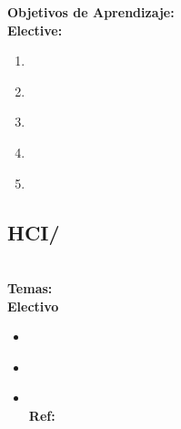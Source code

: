 \noindent \textbf{Objetivos de Aprendizaje:}\\
\noindent \textbf{Elective:}
\begin{enumerate}
	\setcounter{enumi}{0}
	\item \HCIUsercentereddesignandtestingLOExplainHowDesign\xspace[\HCIUsercentereddesignandtestingLOExplainHowDesignLevel]\label{sec:BOK:HCIUsercentereddesignandtestingLOExplainHowDesign}
	\item \HCIUsercentereddesignandtestingLOUseLo\xspace[\HCIUsercentereddesignandtestingLOUseLoLevel]\label{sec:BOK:HCIUsercentereddesignandtestingLOUseLo}
	\item \HCIUsercentereddesignandtestingLOChooseAppropriate\xspace[\HCIUsercentereddesignandtestingLOChooseAppropriateLevel]\label{sec:BOK:HCIUsercentereddesignandtestingLOChooseAppropriate}
	\item \HCIUsercentereddesignandtestingLOUseATechniques\xspace[\HCIUsercentereddesignandtestingLOUseATechniquesLevel]\label{sec:BOK:HCIUsercentereddesignandtestingLOUseATechniques}
	\item \HCIUsercentereddesignandtestingLOCompareThe\xspace[\HCIUsercentereddesignandtestingLOCompareTheLevel]\label{sec:BOK:HCIUsercentereddesignandtestingLOCompareThe}
\end{enumerate}


\subsection{HCI/\HCINewInteractiveTechnologies}\label{sec:BOK:HCINewInteractiveTechnologies}
\HCINewInteractiveTechnologiesDescription\\
\noindent \textbf{Temas:}\\
\noindent \textbf{Electivo}
\begin{itemize}
	\item \HCINewInteractiveTechnologiesTopicChoosing\label{sec:BOK:HCINewInteractiveTechnologiesTopicChoosing}
	\item \HCINewInteractiveTechnologiesTopicRepresenting\label{sec:BOK:HCINewInteractiveTechnologiesTopicRepresenting}
	\item \HCINewInteractiveTechnologiesTopicApproachesTo\xspace \\ \textbf{Ref:} \label{sec:BOK:HCINewInteractiveTechnologiesTopicApproachesTo}
\end{itemize}


